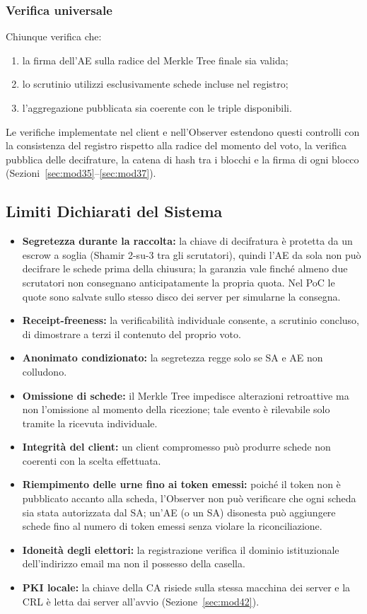 \documentclass[12pt,a4paper]{article}
\begin{document}
\subsubsection{Verifica universale}
Chiunque verifica che:
\begin{enumerate}
  \item la firma dell'AE sulla radice del Merkle Tree finale sia valida;
  \item lo scrutinio utilizzi esclusivamente schede incluse nel registro;
  \item l'aggregazione pubblicata sia coerente con le triple disponibili.
\end{enumerate}

Le verifiche implementate nel client e nell'Observer estendono questi controlli con la
consistenza del registro rispetto alla radice del momento del voto, la verifica pubblica
delle decifrature, la catena di hash tra i blocchi e la firma di ogni blocco
(Sezioni~\ref{sec:mod35}--\ref{sec:mod37}).

\subsection{Limiti Dichiarati del Sistema}

\begin{itemize}
  \item \textbf{Segretezza durante la raccolta:} la chiave di decifratura è protetta da un
    escrow a soglia (Shamir 2-su-3 tra gli scrutatori), quindi l'AE da sola non può
    decifrare le schede prima della chiusura; la garanzia vale finché almeno due
    scrutatori non consegnano anticipatamente la propria quota. Nel PoC le quote sono
    salvate sullo stesso disco dei server per simularne la consegna.
  \item \textbf{Receipt-freeness:} la verificabilità individuale consente, a scrutinio
    concluso, di dimostrare a terzi il contenuto del proprio voto.
  \item \textbf{Anonimato condizionato:} la segretezza regge solo se SA e AE non
    colludono.
  \item \textbf{Omissione di schede:} il Merkle Tree impedisce alterazioni retroattive ma
    non l'omissione al momento della ricezione; tale evento è rilevabile solo tramite
    la ricevuta individuale.
  \item \textbf{Integrità del client:} un client compromesso può produrre schede non
    coerenti con la scelta effettuata.
  \item \textbf{Riempimento delle urne fino ai token emessi:} poiché il token non è
    pubblicato accanto alla scheda, l'Observer non può verificare che ogni scheda sia
    stata autorizzata dal SA; un'AE (o un SA) disonesta può aggiungere schede fino al
    numero di token emessi senza violare la riconciliazione.
  \item \textbf{Idoneità degli elettori:} la registrazione verifica il dominio
    istituzionale dell'indirizzo email ma non il possesso della casella.
  \item \textbf{PKI locale:} la chiave della CA risiede sulla stessa macchina dei server
    e la CRL è letta dai server all'avvio (Sezione~\ref{sec:mod42}).
\end{itemize}
\end{document}
